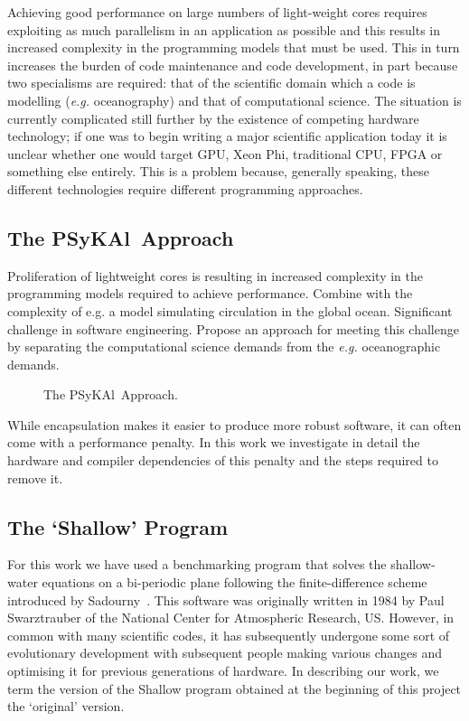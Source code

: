 \documentclass[journal]{IEEEtran}
\newcommand{\psykal}{{PS}y{KA}l\ }
\begin{document}
Achieving good performance on large numbers of light-weight cores
requires exploiting as much parallelism in an application as possible
and this results in increased complexity in the programming models
that must be used. This in turn increases the burden of code
maintenance and code development, in part because two specialisms are
required: that of the scientific domain which a code is modelling
({\it e.g.} oceanography) and that of computational science. The
situation is currently complicated still further by the existence of
competing hardware technology; if one was to begin writing a major
scientific application today it is unclear whether one would target
GPU, Xeon Phi, traditional CPU, FPGA or something else entirely. This
is a problem because, generally speaking, these different technologies
require different programming approaches.


\subsection{The \psykal Approach}
Proliferation of lightweight cores is resulting in increased
complexity in the programming models required to achieve performance.
Combine with the complexity of e.g. a model simulating circulation in
the global ocean. Significant challenge in software engineering.
Propose an approach for meeting this challenge by separating the
computational science demands from the {\it e.g.} oceanographic
demands.

\begin{figure}
\centering
\caption{The \psykal Approach.}
\end{figure}

While encapsulation makes it easier to produce more robust software,
it can often come with a performance penalty. In this work we
investigate in detail the hardware and compiler dependencies of this
penalty and the steps required to remove it.

\subsection{The `Shallow' Program}
For this work we have used a benchmarking program that solves the
shallow-water equations on a bi-periodic plane following the
finite-difference scheme introduced by Sadourny~\cite{sadourny75}.
This software was originally written in 1984 by Paul Swarztrauber of
the National Center for Atmospheric Research, US.  However, in common
with many scientific codes, it has subsequently undergone some sort of
evolutionary development with subsequent people making various changes
and optimising it for previous generations of hardware.  In describing
our work, we term the version of the Shallow program obtained at the
beginning of this project the `original' version.
\end{document}
